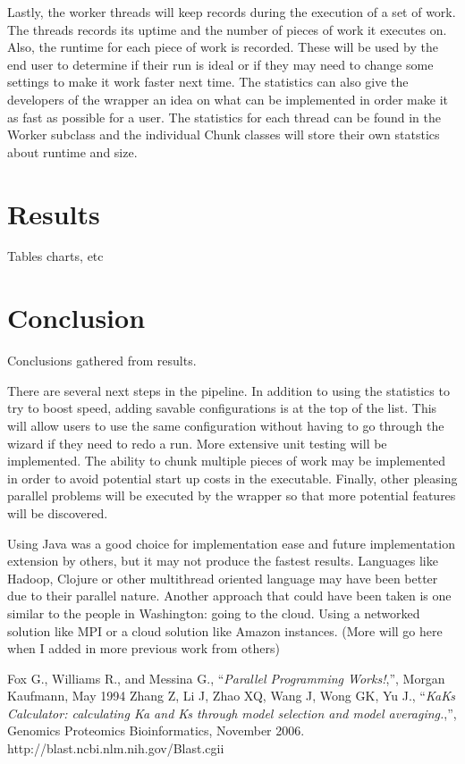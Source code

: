 \documentclass[12pt]{article}
\begin{document}
Lastly, the worker threads will keep records during the execution of a set of 
work. The threads records its uptime and the number of pieces of work it
executes on. Also, the runtime for each piece of work is recorded. These will be
used by the end user to determine if their run is ideal or if they may need to
change some settings to make it work faster next time. The statistics can also
give the developers of the wrapper an idea on what can be implemented in order
make it as fast as possible for a user. The statistics for each thread can be
found in the Worker subclass and the individual Chunk classes will store their
own statstics about runtime and size.

\section{Results}

Tables charts, etc

\section{Conclusion}

Conclusions gathered from results.

There are several next steps in the pipeline. In addition to using the
statistics to try to boost speed, adding savable configurations is at the top of
the list. This will allow users to use the same configuration without having to
go through the wizard if they need to redo a run. More extensive unit testing
will be implemented. The ability to chunk multiple pieces of work may be
implemented in order to avoid potential start up costs in the executable. 
Finally, other pleasing parallel problems will be executed by the wrapper so 
that more potential features will be discovered. 

Using Java was a good choice for implementation ease and future implementation
extension by others, but it may not produce the fastest results. Languages
like Hadoop, Clojure or other multithread oriented language may have been better
due to their parallel nature. Another approach that could have been taken is one
similar to the people in Washington: going to the cloud. Using a networked 
solution like MPI or a cloud solution like Amazon instances. (More will go here
when I added in more previous work from others)

\begin{thebibliography}{1}
Fox G., Williams R., and Messina G., ``\emph{Parallel Programming Works!},'', 
Morgan Kaufmann, May 1994
Zhang Z, Li J, Zhao XQ, Wang J, Wong GK, Yu J., ``\emph{KaKs Calculator: 
calculating Ka and Ks through model selection and model averaging.},'',
Genomics Proteomics Bioinformatics, November 2006.
http://blast.ncbi.nlm.nih.gov/Blast.cgii
\end{thebibliography}
\end{document}

